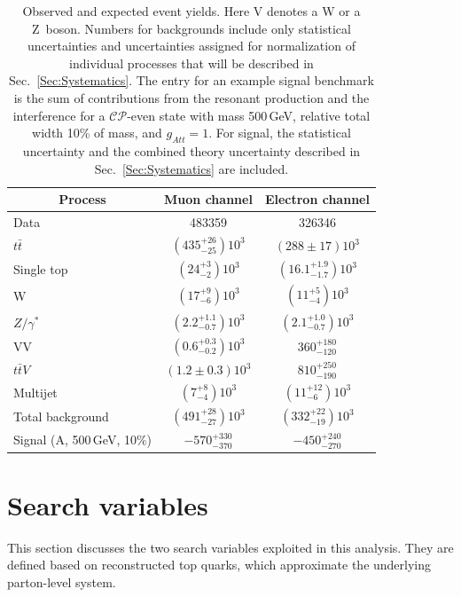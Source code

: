 \begin{table}
  \centering
  \caption{Observed and expected event yields. Here V denotes a W or a Z~boson. Numbers for backgrounds include only statistical uncertainties and uncertainties assigned for normalization of individual processes that will be described in Sec.~\ref{Sec:Systematics}. The entry for an example signal benchmark is the sum of contributions from the resonant production and the interference for a $\mathcal{CP}$-even state with mass 500\,GeV, relative total width 10\% of mass, and $g_{Att} = 1$. For signal, the statistical uncertainty and the combined theory uncertainty described in Sec.~\ref{Sec:Systematics} are included.}
  \label{Tab:EventYields}
  \renewcommand{\arraystretch}{1.5}  %
  \begin{tabular}{lcc}
  \hline
  \hline
  \multicolumn{1}{c}{Process}  & Muon channel  & Electron channel \\
  \hline
  Data              & 483359                                   & 326346  \medskip\\
  $t\bar{t}$        & $\left(435^{+26}_{-25}\right)10^{3}$    & $\left(288 \pm 17\right)10^{3}$  \\
  Single top        & $\left(24^{+3}_{-2}\right)10^{3}$       & $\left(16.1^{+1.9}_{-1.7}\right)10^{3}$  \\
  W                 & $\left(17^{+9}_{-6}\right)10^{3}$       & $\left(11^{+5}_{-4}\right)10^{3}$  \\
  $Z/\gamma^*$      & $\left(2.2^{+1.1}_{-0.7}\right)10^{3}$  & $\left(2.1^{+1.0}_{-0.7}\right)10^{3}$  \\
  VV                & $\left(0.6^{+0.3}_{-0.2}\right)10^{3}$  & $360^{+180}_{-120}$  \\
  $t\bar{t}V$  & $\left(1.2 \pm 0.3\right)10^{3}$        & $810^{+250}_{-190}$  \\
  Multijet          & $\left(7^{+8}_{-4}\right)10^{3}$        & $\left(11^{+12}_{-6}\right)10^{3}$  \medskip\\
  Total background  & $\left(491^{+28}_{-27}\right)10^{3}$    & $\left(332^{+22}_{-19}\right)10^{3}$  \medskip\\
  Signal (A, 500\,GeV, 10\%)  & $-570^{+330}_{-370}$  & $-450^{+240}_{-270}$  \\
  \hline
  \hline
  \end{tabular}
\end{table}

\section{Search variables}
\label{Sec:SearchVars}
%
This section discusses the two search variables exploited in this analysis.
They are defined based on reconstructed top quarks, which approximate the underlying parton-level system.

